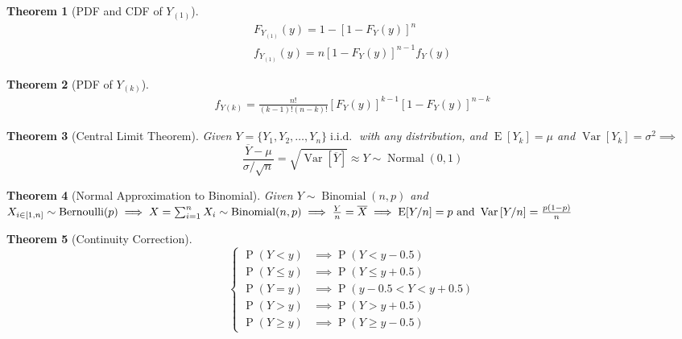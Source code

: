 \documentclass[fontsize=12pt]{article}
\newcommand{\set}[1]{\{#1\}}
\newcommand{\pr}[1]{\operatorname{P}(#1)}
\newcommand{\expt}[1]{\operatorname{E}[#1]}
\newcommand{\var}[1]{\operatorname{Var}\left[#1\right]}
\newcommand{\iid}{\operatorname{i.i.d.}}
\newcommand{\binomdist}[3]{#1 \sim \operatorname{Binomial}(#2, #3)}
\newcommand{\berndist}[2]{#1 \sim \operatorname{Bernoulli}(#2)}
\newcommand{\normdist}[3]{#1 \sim \operatorname{Normal}(#2, #3)}
\newcommand{\setcompl}[1]{\overline{#1}}
\renewcommand{\and}{\text{ and }}
\newtheorem*{theorem}{Theorem}
\begin{document}
\begin{theorem}[PDF and CDF of $Y_{(1)}$]
    \begin{gather}
        F_{Y_{(1)}}(y) = 1 - \left[1 - F_Y(y)\right]^n\\
        f_{Y_{(1)}}(y) = n\left[1 - F_Y(y)\right]^{n-1}f_Y(y)
    \end{gather}
\end{theorem}

\begin{theorem}[PDF of $Y_{(k)}$]
    \begin{gather}
        f_{Y{(k)}} = \frac{n!}{(k-1)!(n-k)!}\left[F_Y(y)\right]^{k-1}\left[ 1 - F_Y(y) \right]^{n-k}
    \end{gather}
\end{theorem}

\begin{theorem}[Central Limit Theorem]
    Given $Y = \set{Y_1, Y_2, \ldots, Y_n}\iid$ with any distribution, and $\expt{Y_k} = \mu$ and $\var{Y_k} = \sigma^2 \implies $ \[
        \frac{\setcompl{Y} - \mu}{\sigma/\sqrt{n}} = \sqrt{\var{\setcompl{Y}}}
        \approx \normdist{Y}{0}{1}
    \]
\end{theorem}

\begin{theorem}[Normal Approximation to Binomial]
    Given $\binomdist{Y}{n}{p}$ 
    and $\berndist{X_{i\in[1,n]}}{p}\\
    \implies X=\binomdist{\sum_{i=1}^{n}X_i}{n}{p} 
    \implies \frac{Y}{n} = \overline{X} 
    \implies \expt{Y/n} = p \and \var{Y/n} = \frac{p(1-p)}{n}$
\end{theorem}

\begin{theorem}[Continuity Correction]
\[
    \begin{cases}
        \pr{Y < y}      & \implies \pr{Y < y - 0.5}\\
        \pr{Y \leq y}   & \implies \pr{Y \leq y + 0.5}\\
        \pr{Y = y}      & \implies \pr{y - 0.5 < Y < y+ 0.5}\\
        \pr{Y > y}      & \implies \pr{Y > y + 0.5}\\
        \pr{Y \geq y}   & \implies \pr{Y \geq y - 0.5}
    \end{cases}
\]
\end{theorem}



\clearpage
\end{document}
